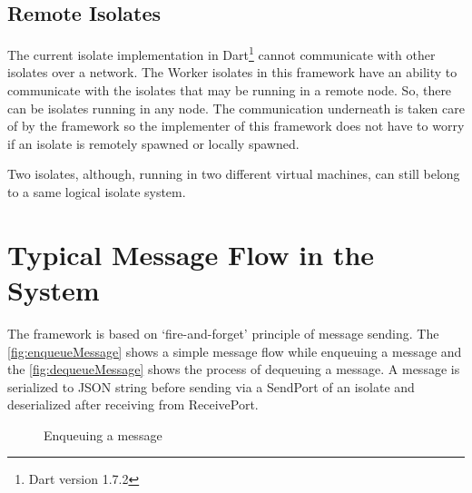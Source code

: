 \subsection{Remote Isolates}
\label{subsec:remoteIsolate}
  The current isolate implementation in Dart\footnote{Dart version 1.7.2} cannot communicate with other isolates over a network. The Worker isolates in this framework have an ability to communicate with the isolates that may be running in a remote node. So, there can be isolates running in any node. The communication underneath is taken care of by the framework so the implementer of this framework does not have to worry if an isolate is remotely spawned or locally spawned.

  Two isolates, although, running in two different virtual machines, can still belong to a same logical isolate system.

\section{Typical Message Flow in the System}
The framework is based on ‘fire-and-forget’ principle of message sending. The \autoref{fig:enqueueMessage} shows a simple message flow while enqueuing a message and the \autoref{fig:dequeueMessage} shows the process of dequeuing a message.
A message is serialized to JSON string before sending via a SendPort of an isolate and deserialized after receiving from ReceivePort.

\begin{figure}[H]
  \centering
  \tiny
\begin{sequencediagram}


\end{sequencediagram}
  \caption{Enqueuing a message}
\end{figure}
\label{fig:enqueueMessage}
\normalsize

